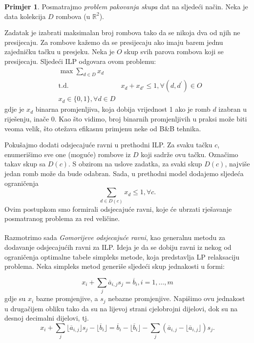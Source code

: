 \documentclass[a4paper, utf8, 11pt, colorlinks]{book}
\theoremstyle{definition}
\newtheorem{primjer}{Primjer}[chapter]
\begin{document}
\begin{primjer}
Posmatrajmo   \emph{problem pakovanja skupa} dat na sljedeći način. Neka je data kolekcija $D$ rombova (u $\mathbb{R}^2$). 
\end{primjer}
Zadatak je izabrati maksimalan broj rombova tako da se nikoja dva od njih ne presijecaju.  Za rombove kažemo da se presijecaju ako imaju barem jednu zajedničku tačku u presjeku. 
Neka je $O$ skup svih parova rombova koji se presijecaju. Sljedeći ILP odgovara ovom problemu:
\begin{align*}
    &\max \sum_{d\in D}x_d\\
    &\mbox{t.d.}
    & x_d + x_{d'} \leq 1, \forall (d, d^{'}) \in O \\
    & x_d \in \{0,1\}, \forall d \in D
\end{align*}
gdje je $x_d$ binarna promjenljiva, koja dobija vrijednost 1 ako je romb $d$ izabran u riješenju, inače 0. 
Kao što vidimo, broj binarnih promjenljivih u praksi može biti veoma velik, što otežava efikasnu primjenu neke od B\&B tehnika.

Pokušajmo dodati odsjecajuće ravni u prethodni ILP. Za svaku tačku $c$, enumerišimo sve one (moguće) rombove iz $D$ koji sadrže ovu tačku. Označimo takav skup sa $D(c)$. S obzirom na uslove zadatka, za svaki skup $D(c)$, najviše jedan romb može da bude odabran. Sada,  u prethodni model dodajemo sljedeća ograničenja
\begin{equation}
     \sum_{d \in D(c)} x_d \leq 1, \forall c.
\end{equation}
Ovim postupkom smo formirali odsjecajuće ravni, koje će ubrzati rješavanje posmatranog problema za   red veličine.\\ \vspace{0.2cm} \\

Razmotrimo sada \emph{Gomorijeve odsjecajuće ravni}, kao generalnu metodu za dodavanje odsjecajućih ravni za  ILP.  Ideja je da se dobiju ravni iz nekog od ograničenja optimalne tabele simpleks metode, koja predstavlja LP relaksaciju problema. Neka simpleks metod generiše sljedeći skup jednakosti u formi:


$$x_i + \sum_{ j} \overline{a}_{i,j} s_j= \overline{b}_i, i=1, \ldots,m$$
gdje su $x_i$ bazne promjenjive, a $s_j$ nebazne promjenjive. Napišimo ovu jednakost u drugačijem obliku tako da su na lijevoj strani cjelobrojni dijelovi, dok su na desnoj decimalni dijelovi, tj.
$$x_i + \sum_{j} \lfloor \overline{a}_{i,j} \rfloor s_j - \lfloor \overline{b}_i \rfloor = \overline{b}_i - \lfloor \overline{b}_i  \rfloor    - \sum_{j} (\overline{a}_{i,j} - \lfloor \overline{a}_{i,j} \rfloor) s_j.$$
\end{document}
